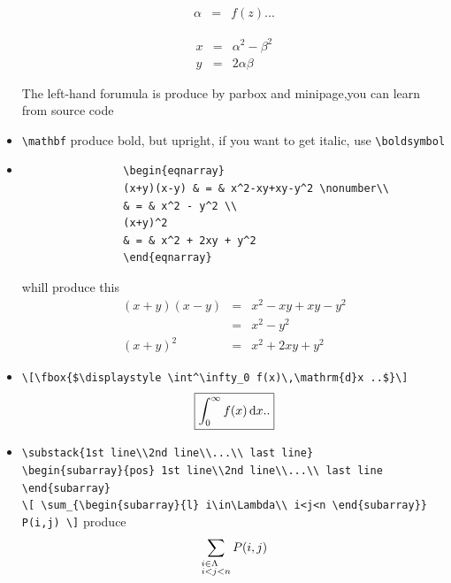 \documentclass[a4paper,12pt,twoside]{book}
\begin{document}
\begin{itemize}
				\parbox{4cm}{\begin{eqnarray} \alpha &=& f(z)...\end{eqnarray}}
				\hfill \parbox{2.5cm}{\begin{eqnarray*}
				x &=& \alpha^2 - \beta^2\\ y &=& 2\alpha\beta \end{eqnarray*}}
				\hfill \begin{minipage}{4.5cm} The left-hand forumula is produce by parbox and minipage,you can learn from source code \end{minipage}
			\item
			\verb=\mathbf= produce bold, but upright, if you want to get italic, use \verb=\boldsymbol=
			\item
			\begin{verbatim}
				\begin{eqnarray}
				(x+y)(x-y) & = & x^2-xy+xy-y^2 \nonumber\\
				& = & x^2 - y^2 \\
				(x+y)^2
				& = & x^2 + 2xy + y^2
				\end{eqnarray}
			\end{verbatim}
			whill produce this
			\begin{eqnarray}
			(x+y)(x-y) & = & x^2-xy+xy-y^2 \nonumber\\
			& = & x^2 - y^2 \\
			(x+y)^2
			& = & x^2 + 2xy + y^2
			\end{eqnarray}

			\item \verb=\[\fbox{$\displaystyle \int^\infty_0 f(x)\,\mathrm{d}x ..$}\]=
				\[\fbox{$\displaystyle \int^\infty_0 f(x)\,\mathrm{d}x ..$}\]
			
			\item
			\verb=\substack{1st line\\2nd line\\...\\ last line}= \\
			\verb=\begin{subarray}{pos} 1st line\\2nd line\\...\\ last line \end{subarray}= \\
			\verb=\[ \sum_{\begin{subarray}{l} i\in\Lambda\\ i<j<n \end{subarray}} P(i,j) \]= produce
			\[ \sum_{\begin{subarray}{l}i\in\Lambda\\ i<j<n\end{subarray}} P(i,j) \]
			\end{itemize}
\end{document}
